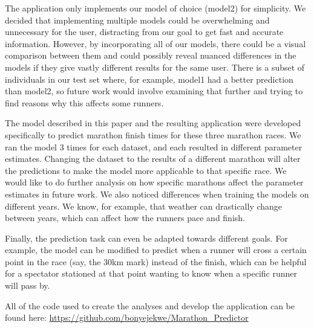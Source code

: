 \documentclass[USenglish,twocolumn]{article}
\theoremstyle{dgthm}
\theoremstyle{dgdef}
\begin{document}
The application only implements our model of choice (model2) for simplicity. We decided that implementing multiple models could be overwhelming and unnecessary for the user, distracting from our goal to get fast and accurate information. However, by incorporating all of our models, there could be a visual comparison between them and could possibly reveal nuanced differences in the models if they give vastly different results for the same user. There is a subset of individuals in our test set where, for example, model1 had a better prediction than model2, so future work would involve examining that further and trying to find reasons why this affects some runners.

The model described in this paper and the resulting application were developed specifically to predict marathon finish times for these three marathon races. We ran the model 3 times for each dataset, and each resulted in different parameter estimates. Changing the dataset to the results of a different marathon will alter the predictions to make the model more applicable to that specific race. We would like to do further analysis on how specific marathons affect the parameter estimates in future work. We also noticed differences when training the models on different years. We know, for example, that weather can drastically change between years, which can affect how the runners pace and finish.

Finally, the prediction task can even be adapted towards different goals. For example, the model can be modified to predict when a runner will cross a certain point in the race (say, the 30km mark) instead of the finish, which can be helpful for a spectator stationed at that point wanting to know when a specific runner will pass by. 

All of the code used to create the analyses and develop the application can be found here: \url{https://github.com/bonyejekwe/Marathon_Predictor}

\end{document}
